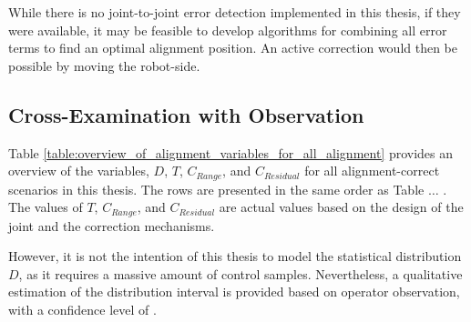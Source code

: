 While there is no joint-to-joint error detection implemented in this thesis, if they were available, it may be feasible to develop algorithms for combining all error terms to find an optimal alignment position. An active correction would then be possible by moving the robot-side.

\subsection{Cross-Examination with Observation}

Table \ref{table:overview_of_alignment_variables_for_all_alignment} provides an overview of the variables, $D$, $T$, $C_{Range}$, and $C_{Residual}$ for all alignment-correct scenarios in this thesis. The rows are presented in the same order as Table $\ldots$ . The values of $T$, $C_{Range}$, and $C_{Residual}$ are actual values based on the design of the joint and the correction mechanisms. 

However, it is not the intention of this thesis to model the statistical distribution $D$, as it requires a massive amount of control samples. Nevertheless, a qualitative estimation of the distribution interval is provided based on operator observation, with a confidence level of .

